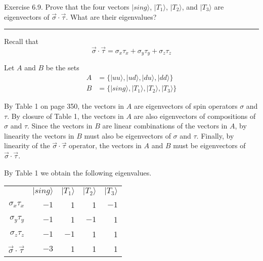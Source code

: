\documentclass[12pt]{article}
\begin{document}
Exercise 6.9.
Prove that the four vectors $|sing\rangle$, $|T_1\rangle$,
$|T_2\rangle$, and $|T_3\rangle$ are eigenvectors of
$\vec\sigma\cdot\vec\tau$.
What are their eigenvalues?

\bigskip
\hrule

\bigskip
Recall that
\begin{equation*}
\vec\sigma\cdot\vec\tau=\sigma_x\tau_x+\sigma_y\tau_y+\sigma_z\tau_z
\end{equation*}

Let $A$ and $B$ be the sets
\begin{align*}
A&=\{|uu\rangle, |ud\rangle, |du\rangle, |dd\rangle\}
\\
B&=\{|sing\rangle, |T_1\rangle, |T_2\rangle, |T_3\rangle\}
\end{align*}

By Table 1 on page 350, the vectors in $A$ are eigenvectors of spin operators $\sigma$ and $\tau$.
By closure of Table 1, the vectors in $A$ are also eigenvectors of compositions of $\sigma$ and $\tau$.
Since the vectors in $B$ are linear combinations of the vectors in $A$,
by linearity the vectors in $B$ must also be eigenvectors of $\sigma$ and $\tau$.
Finally, by linearity of the $\vec\sigma\cdot\vec\tau$ operator,
the vectors in $A$ and $B$ must
be eigenvectors of $\vec\sigma\cdot\vec\tau$.

\bigskip
By Table 1 we obtain the following eigenvalues.
\begin{center}
\begin{tabular}{rrrrr}
& $|sing\rangle$ & $|T_1\rangle$ & $|T_2\rangle$ & $|T_3\rangle$
\\[1ex]
$\sigma_x\tau_x$ & $-1$ & 1 & 1 & $-1$
\\
$\sigma_y\tau_y$ & $-1$ & 1 & $-1$ & 1
\\
$\sigma_z\tau_z$ & $-1$ & $-1$ & 1 & 1
\\[1ex]
$\vec\sigma\cdot\vec\tau$ & $-3$ & 1 & 1 & 1
\end{tabular}
\end{center}
\end{document}
